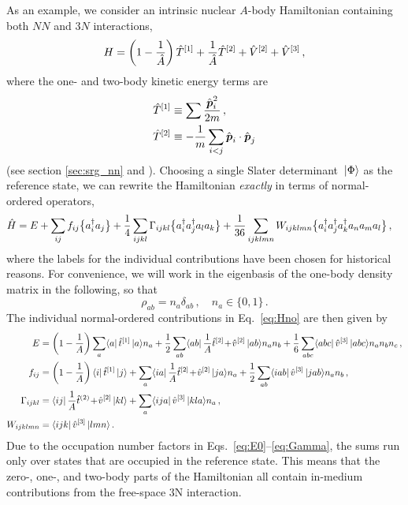 As an example, we consider an intrinsic nuclear $A$-body Hamiltonian 
containing both $NN$ and $3N$ interactions,
\begin{equation}\label{eq:def_Hint}
  H = \left(1-\frac{1}{\AO}\right)\TO^{[1]} + \frac{1}{\AO}\TO^{[2]} + \VO^{[2]} +\VO^{[3]}\,,
\end{equation}
where the one- and two-body kinetic energy terms are
\begin{align}
  \TO^{[1]} &\equiv \sum\frac{\pOV^2_i}{2m}\,,\\
  \TO^{[2]} &\equiv -\frac{1}{m}\sum_{i<j}\pOV_i\cdot\pOV_j
\end{align}
(see section \ref{sec:srg_nn} and \cite{Hergert:2009wh}). Choosing a 
single Slater determinant $\,|{\Phi}\rangle$ as the reference state, we can 
rewrite the Hamiltonian \emph{exactly} in terms of normal-ordered operators,
\begin{align}\label{eq:Hno}
  \HO &= E + \sum_{ij}f_{ij}\nord{\aaO_{i}\aO_{j}} + \frac{1}{4}\sum_{ijkl}\Gamma_{ijkl}\nord{\aaO_{i}\aaO_{j}\aO_{l}\aO_{k}}
    + \frac{1}{36}\sum_{ijklmn}W_{ijklmn}\nord{\aaO_{i}\aaO_{j}\aaO_{k}\aO_{n}\aO_{m}\aO_{l}}\,,
\end{align}
where the labels for the individual contributions have been chosen for 
historical reasons. For convenience, we will work in the eigenbasis of 
the one-body density matrix in the following, so that
\begin{equation}\label{eq:def_natorb}
  \rho_{ab}=n_{a}\delta_{ab}\,,\quad n_{a}\in\{0,1\}\,.
\end{equation}
The individual normal-ordered contributions in Eq.~\eqref{eq:Hno} are then 
given by
\begin{align}
  E &= \left(1-\frac{1}{A}\right)\sum_{a}\matrixe{a}{\tO^{[1]}}{a}n_{a}
      + \frac{1}{2}\sum_{ab}\matrixe{ab}{\frac{1}{A}\tO^{[2]}\!+\!\vO^{[2]}}{ab}n_{a}n_{b}
      + \frac{1}{6}\sum_{abc}\matrixe{abc}{\vO^{[3]}}{abc}n_{a}n_{b}n_{c}\,,\label{eq:E0}\\
%
  f_{ij} &= \left(1-\frac{1}{A}\right)\matrixe{i}{\tO^{[1]}}{j} 
      + \sum_{a}\matrixe{ia}{\frac{1}{A}\tO^{[2]}\!+\!\vO^{[2]}}{ja}n_{a}
      + \frac{1}{2}\sum_{ab}\matrixe{iab}{\vO^{[3]}}{jab}n_{a}n_{b}\,,\label{eq:f}   
      \\
% 
  \Gamma_{ijkl} &= \matrixe{ij}{\frac{1}{A}\tO^{(2)}\!+\!\vO^{[2]}}{kl} + \sum_{a}\matrixe{ija}{\vO^{[3]}}{kla}n_{a}\,,\label{eq:Gamma}\\
  W_{ijklmn}&=\matrixe{ijk}{\vO^{[3]}}{lmn}\,.
\end{align}
Due to the occupation number factors in Eqs.~\eqref{eq:E0}--\eqref{eq:Gamma}, the sums 
run only over states that are occupied in the reference state. This means that the 
zero-, one-, and two-body parts of the Hamiltonian all contain in-medium contributions 
from the free-space 3N interaction.

